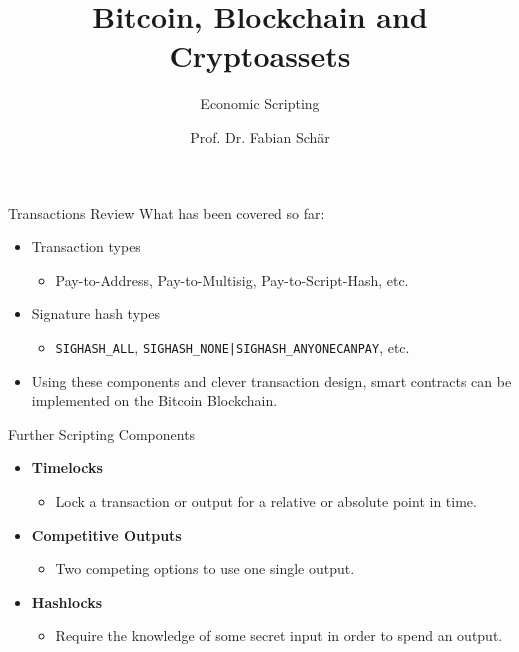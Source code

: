 \documentclass[handout]{beamer}
\title{Bitcoin, Blockchain and Cryptoassets}
\subtitle{Economic Scripting}
\author{Prof. Dr. Fabian Schär}
\institute{University of Basel}
\begin{document}
\thispagestyle{empty}
\begin{frame}[noframenumbering]
	\titlepage
\end{frame}


\begin{frame}{Transactions Review}
	What has been covered so far:
	\begin{itemize}
		\item<1 -> Transaction types
		\begin{itemize}
			\item<1 -> Pay-to-Address, Pay-to-Multisig, Pay-to-Script-Hash, etc.
		\end{itemize}
		\item<2 -> Signature hash types
		\begin{itemize}
			\item<2 -> \texttt{SIGHASH\_ALL}, \texttt{SIGHASH\_NONE|SIGHASH\_ANYONECANPAY}, etc.
		\end{itemize}
		\item<3 -> Using these components and clever transaction design, smart contracts can be implemented on the Bitcoin Blockchain.
	\end{itemize}
\end{frame}


\begin{frame}{Further Scripting Components}
	\begin{itemize}
		\item<1-> \textbf{Timelocks}
		\begin{itemize}
			\item<1-> Lock a transaction or output for a relative or absolute point in time.
		\end{itemize}
		\vspace{0.25cm}
		\item<2-> \textbf{Competitive Outputs}
		\begin{itemize}
			\item<2-> Two competing options to use one single output.
		\end{itemize}
		\vspace{0.25cm}
		\item<3-> \textbf{Hashlocks}
		\begin{itemize}
			\item<3-> Require the knowledge of some secret input in order to spend an output.
		\end{itemize}
	\end{itemize}
\end{frame}
\end{document}
